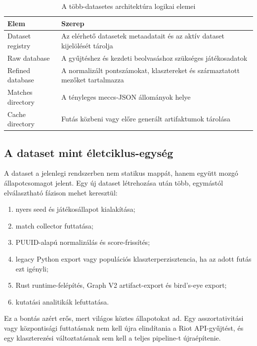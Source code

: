 \begin{table}[H]
\centering
\caption{A több-datasetes architektúra logikai elemei}
\begin{tabularx}{\textwidth}{>{\raggedright\arraybackslash}p{3.2cm}X}
\toprule
\textbf{Elem} & \textbf{Szerep} \\
\midrule
Dataset registry & Az elérhető datasetek metaadatait és az aktív dataset kijelölését tárolja \\
Raw database & A gyűjtéshez és kezdeti beolvasáshoz szükséges játékosadatok \\
Refined database & A normalizált pontszámokat, klasztereket és származtatott mezőket tartalmazza \\
Matches directory & A tényleges meccs-JSON állományok helye \\
Cache directory & Futás közbeni vagy előre generált artifaktumok tárolása \\
\bottomrule
\end{tabularx}
\end{table}

\subsection{A dataset mint életciklus-egység}

A dataset a jelenlegi rendszerben nem statikus mappát, hanem együtt mozgó állapotcsomagot jelent. Egy új dataset létrehozása után több, egymástól elválasztható fázison mehet keresztül:

\begin{enumerate}
    \item nyers seed és játékosállapot kialakítása;
    \item match collector futtatása;
    \item PUUID-alapú normalizálás és score-frissítés;
    \item legacy Python export vagy populációs klaszterperzisztencia, ha az adott futás ezt igényli;
    \item Rust runtime-felépítés, Graph V2 artifact-export és bird's-eye export;
    \item kutatási analitikák lefuttatása.
\end{enumerate}

Ez a bontás azért erős, mert világos köztes állapotokat ad. Egy asszortativitási vagy központisági futtatásnak nem kell újra elindítania a Riot API-gyűjtést, és egy klaszterezési változtatásnak sem kell a teljes pipeline-t újraépítenie.

